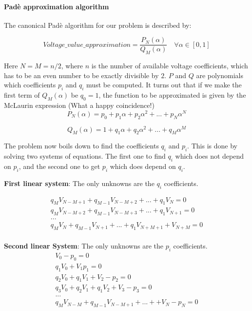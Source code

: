 \documentclass[a4paper,twoside,fleqn]{tufte-book}
\begin{document}
\paragraph{Padè approximation algorithm}

The canonical Padè algorithm for our problem is described by:

\begin{equation}
Voltage\_value\_approximation = \frac{P_N(\alpha)}{Q_M(\alpha)} \quad \forall \alpha \in [0,1]
\label{eq:pade_apprx}
\end{equation}

Here $N=M=n/2$, where $n$ is the number of available voltage coefficients, which has to be an even number to be exactly divisible by $2$. $P$ and $Q$ are polynomials which coefficients $p_i$ and $q_i$ must be computed. It turns out that if we make the first term of $Q_M(\alpha)$ be $q_0=1$, the function to be approximated is given by the McLaurin expression (What a happy coincidence!)
\begin{equation}
P_N(\alpha) = p_0 + p_1\alpha + p_2\alpha^2 + ... + p_N\alpha^N
\end{equation}

\begin{equation}
Q_M(\alpha) = 1 + q_1\alpha + q_2\alpha^2 + ... + q_M\alpha^M
\end{equation}



The problem now boils down to find the coefficients $q_i$ and $p_i$. This is done by solving two systems of equations. The first one to find $q_i$ which does not depend on $p_i$, and the second one to get $p_i$ which does depend on $q_i$.

\textbf{First linear system}: The only unknowns are the $q_i$ coefficients.

\begin{equation}
\begin{matrix}
q_M V_{N-M+1} + q_{M-1}V_{N-M+2}+...+q_1V_N = 0\\
q_M V_{N-M+2} + q_{M-1}V_{N-M+3}+...+q_1V_{N+1} = 0\\
...\\
q_M V_{N} + q_{M-1}V_{N+1}+...+q_1V_{N+M+1} + V_{N+M} = 0\\
\end{matrix}
\end{equation}

\textbf{Second linear System}: The only unknowns are the $p_i$ coefficients.
\begin{equation}
\begin{matrix}
V_0 - p_0=0\\
q_1V_0 + V_1  p_1=0\\
q_2V_0 + q_1V_1+V_2-p_2=0\\
q_3V_0 + q_2V_1 + q_1V_2 + V_3 - p_3 = 0\\
...\\
q_MV_{N-M} + q_{M-1}V_{N-M+1} + ... + +V_N - p_N=0
\end{matrix}
\end{equation}
\end{document}
